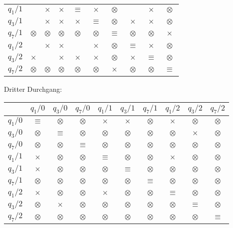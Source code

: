 \begin{loesung}
\begin{teilaufgaben}
\begin{center}
\begin{tabular}{|c|ccccccccc|}
$q_1/1$  &         &$\times$ &$\times$ &$\equiv$ &$\times$ &$\otimes$&         &$\times$ &$\otimes$\\
$q_3/1$  &         &$\times$ &$\times$ &$\times$ &$\equiv$ &$\otimes$&$\times$ &$\times$ &$\otimes$\\
$q_7/1$  &$\otimes$&$\otimes$&$\otimes$&$\otimes$&$\otimes$&$\equiv$ &$\otimes$&$\otimes$&$\times$ \\
$q_1/2$  &         &$\times$ &$\times$ &         & $\times$&$\otimes$&$\equiv$& $\times$&$\otimes$\\
$q_3/2$  &$\times$ &         &$\times$ &$\times$ &$\times$ &$\otimes$&$\times$ &$\equiv$ &$\otimes$\\
$q_7/2$  &$\otimes$&$\otimes$&$\otimes$&$\otimes$&$\otimes$&$\times$ &$\otimes$&$\otimes$&$\equiv$ \\
\hline
\end{tabular}
\end{center}
Dritter Durchgang:
\begin{center}
\begin{tabular}{|c|ccccccccc|}
\hline
         &$q_1/0$  &$q_3/0$  &$q_7/0$  &$q_1/1$  &$q_3/1$  &$q_7/1$  &$q_1/2$  &$q_3/2$  &$q_7/2$  \\
\hline
$q_1/0$  &$\equiv$ &$\otimes$&$\otimes$&$\times$ &$\times$ &$\otimes$&$\times$ &$\otimes$&$\otimes$\\
$q_3/0$  &$\otimes$&$\equiv$ &$\otimes$&$\otimes$&$\otimes$&$\otimes$&$\otimes$&$\times$ &$\otimes$\\
$q_7/0$  &$\otimes$&$\otimes$&$\equiv$ &$\otimes$&$\otimes$&$\otimes$&$\otimes$&$\otimes$&$\otimes$\\
$q_1/1$  &$\times$ &$\otimes$&$\otimes$&$\equiv$ &$\otimes$&$\otimes$&$\times$ &$\otimes$&$\otimes$\\
$q_3/1$  &$\times$ &$\otimes$&$\otimes$&$\otimes$&$\equiv$ &$\otimes$&$\otimes$&$\otimes$&$\otimes$\\
$q_7/1$  &$\otimes$&$\otimes$&$\otimes$&$\otimes$&$\otimes$&$\equiv$ &$\otimes$&$\otimes$&$\otimes$\\
$q_1/2$  &$\times$ &$\otimes$&$\otimes$&$\times$ &$\otimes$&$\otimes$&$\equiv$ &$\otimes$&$\otimes$\\
$q_3/2$  &$\otimes$&$\times$ &$\otimes$&$\otimes$&$\otimes$&$\otimes$&$\otimes$&$\equiv$ &$\otimes$\\
$q_7/2$  &$\otimes$&$\otimes$&$\otimes$&$\otimes$&$\otimes$&$\otimes$&$\otimes$&$\otimes$&$\equiv$ \\
\hline
\end{tabular}

\end{center}
\end{teilaufgaben}
\end{loesung}
